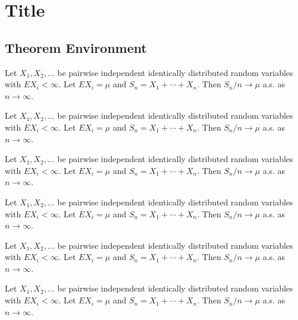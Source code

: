 \chapter{Title}\label{chapter: 2}
\section{Theorem Environment}
\begin{theorem}\label{theorem: convergence}
    Let $X_1,X_2,\dots$ be pairwise independent identically distributed random variables with $EX_i<\infty$. Let $EX_i=\mu$ and $S_n=X_1+\cdots+X_n$. Then $S_n/n\rightarrow\mu$ a.s. as $n\rightarrow\infty$.
\end{theorem}

\begin{lemma}\label{lemma: convergence}
    Let $X_1,X_2,\dots$ be pairwise independent identically distributed random variables with $EX_i<\infty$. Let $EX_i=\mu$ and $S_n=X_1+\cdots+X_n$. Then $S_n/n\rightarrow\mu$ a.s. as $n\rightarrow\infty$.
\end{lemma}

\begin{definition}\label{definition: convergence}
    Let $X_1,X_2,\dots$ be pairwise independent identically distributed random variables with $EX_i<\infty$. Let $EX_i=\mu$ and $S_n=X_1+\cdots+X_n$. Then $S_n/n\rightarrow\mu$ a.s. as $n\rightarrow\infty$.
\end{definition}

\begin{proposition}\label{proposition: convergence}
    Let $X_1,X_2,\dots$ be pairwise independent identically distributed random variables with $EX_i<\infty$. Let $EX_i=\mu$ and $S_n=X_1+\cdots+X_n$. Then $S_n/n\rightarrow\mu$ a.s. as $n\rightarrow\infty$.
\end{proposition}

\begin{assumption}\label{assumption: convergence}
    Let $X_1,X_2,\dots$ be pairwise independent identically distributed random variables with $EX_i<\infty$. Let $EX_i=\mu$ and $S_n=X_1+\cdots+X_n$. Then $S_n/n\rightarrow\mu$ a.s. as $n\rightarrow\infty$.
\end{assumption}

\begin{remark}\label{remark: convergence}
    Let $X_1,X_2,\dots$ be pairwise independent identically distributed random variables with $EX_i<\infty$. Let $EX_i=\mu$ and $S_n=X_1+\cdots+X_n$. Then $S_n/n\rightarrow\mu$ a.s. as $n\rightarrow\infty$.
\end{remark}

